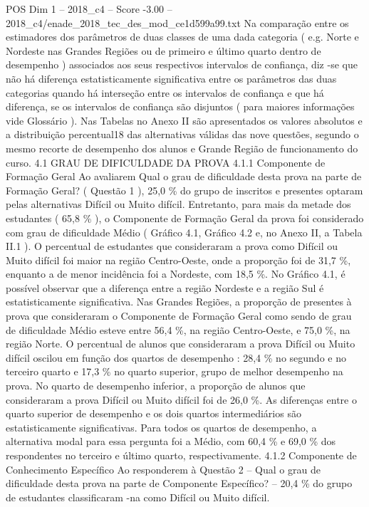 \begin{textsample}{POS Dim 1 – 2018\_c4 – Score -3.00 – 2018\_c4/enade\_2018\_tec\_des\_mod\_ce1d599a99.txt}
Na comparação entre os estimadores dos parâmetros de duas classes de uma dada categoria ( e.g.
Norte e Nordeste nas Grandes Regiões ou de primeiro e último quarto dentro de desempenho ) associados aos seus respectivos intervalos de confiança, diz -se que não há diferença estatisticamente significativa entre os parâmetros das duas categorias quando há interseção entre os intervalos de confiança e que há diferença, se os intervalos de confiança são disjuntos ( para maiores informações vide Glossário ).
Nas Tabelas no Anexo II são apresentados os valores absolutos e a distribuição percentual18 das alternativas válidas das nove questões, segundo o mesmo recorte de desempenho dos alunos e Grande Região de funcionamento do curso. 4.1 GRAU DE DIFICULDADE DA PROVA 4.1.1 Componente de Formação Geral Ao avaliarem Qual o grau de dificuldade desta prova na parte de Formação Geral? ( Questão 1 ), 25,0 \% do grupo de inscritos e presentes optaram pelas alternativas Difícil ou Muito difícil.
Entretanto, para mais da metade dos estudantes ( 65,8 \% ), o Componente de Formação Geral da prova foi considerado com grau de dificuldade Médio ( Gráfico 4.1, Gráfico 4.2 e, no Anexo II, a Tabela II.1 ).
O percentual de estudantes que consideraram a prova como Difícil ou Muito difícil foi maior na região Centro-Oeste, onde a proporção foi de 31,7 \%, enquanto a de menor incidência foi a Nordeste, com 18,5 \%.
No Gráfico 4.1, é possível observar que a diferença entre a região Nordeste e a região Sul é estatisticamente significativa.
Nas Grandes Regiões, a proporção de presentes à prova que consideraram o Componente de Formação Geral como sendo de grau de dificuldade Médio esteve entre 56,4 \%, na região Centro-Oeste, e 75,0 \%, na região Norte.
O percentual de alunos que consideraram a prova Difícil ou Muito difícil oscilou em função dos quartos de desempenho : 28,4 \% no segundo e no terceiro quarto e 17,3 \% no quarto superior, grupo de melhor desempenho na prova.
No quarto de desempenho inferior, a proporção de alunos que consideraram a prova Difícil ou Muito difícil foi de 26,0 \%.
As diferenças entre o quarto superior de desempenho e os dois quartos intermediários são estatisticamente significativas.
Para todos os quartos de desempenho, a alternativa modal para essa pergunta foi a Médio, com 60,4 \% e 69,0 \% dos respondentes no terceiro e último quarto, respectivamente. 4.1.2 Componente de Conhecimento Específico Ao responderem à Questão 2 – Qual o grau de dificuldade desta prova na parte de Componente Específico? – 20,4 \% do grupo de estudantes classificaram -na como Difícil ou Muito difícil.

\end{textsample}
